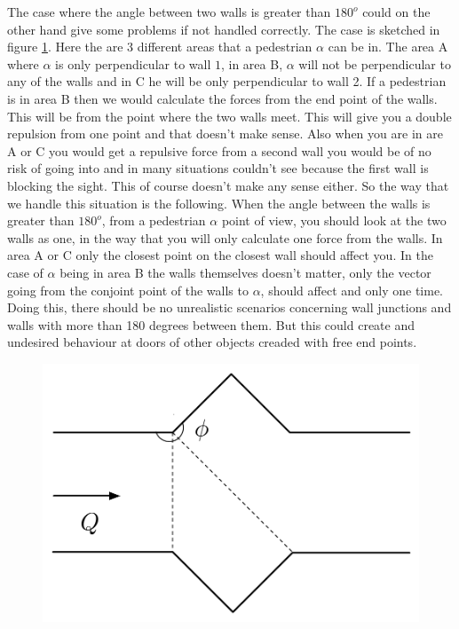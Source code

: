 The case where the angle between two walls is greater than $180^o$ could on the 
other hand give some problems if not handled correctly. The case is sketched in 
figure \ref{fig:wallcase}. Here the are 3 different areas that a pedestrian $\alpha$ 
can be in. The area A where $\alpha$ is only perpendicular to wall $1$, in area B, 
$\alpha$ will not be perpendicular to any of the walls and in C he will be only 
perpendicular to wall 2. If a pedestrian is in area B then we would calculate the 
forces from the end point of the walls. This will be from the point where the two 
walls meet. This will give you a double repulsion from one point and that 
doesn't make sense. Also when you are in are A or C you would get a repulsive force 
from a second wall you would be of no risk of going into and in many situations 
couldn't see because the first wall is blocking the sight. This of course doesn't 
make any sense either. So the way that we handle this situation is the following. 
When the angle between the walls is greater than $180^o$, from a pedestrian $\alpha$ 
point of view, you should look at the two walls as one, in the way that you will 
only calculate one force from the walls. In area A or C only the closest point 
on the closest wall should affect you. In the case of $\alpha$ being in area B 
the walls themselves doesn't matter, only the vector going from the conjoint 
point of the walls to $\alpha$, should affect and only one time. Doing this, 
there should be no unrealistic scenarios concerning wall junctions and walls 
with more than 180 degrees between them. But this could create and undesired 
behaviour at doors of other objects creaded with free end points.

\begin{figure}[ht]
\centering
\includegraphics[scale=0.45]{Figures/WallCase.pdf} 
\caption{}\label{fig:wallcase}
\end{figure}

